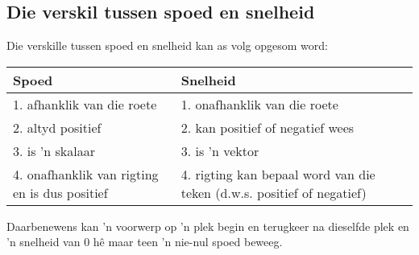 \subsection*{Die verskil tussen spoed en snelheid}
Die verskille tussen spoed en snelheid kan as volg opgesom word:\par
\begin{center}
\begin{tabular}{|p{5cm}|p{5cm}|}\hline
\textbf{Spoed} & \textbf{Snelheid} \\\hline
1. afhanklik van die roete & 1. onafhanklik van die roete \\\hline
2. altyd positief & 2. kan positief of negatief wees \\\hline
3. is 'n skalaar & 3. is 'n vektor \\\hline
4. onafhanklik van rigting en is dus positief & 4. rigting kan bepaal word van die teken (d.w.s. positief of negatief) \\\hline
\end{tabular}
\end{center}
Daarbenewens kan 'n voorwerp op 'n plek begin en terugkeer na dieselfde plek en 'n snelheid van 0 h\^e maar teen 'n nie-nul spoed beweeg. 
\vspace{-1cm}
